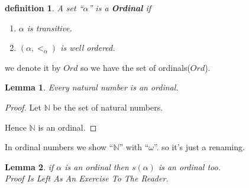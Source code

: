 \documentclass[10pt,a4paper]{book}
\newtheorem{definition}{definition}[section]
\newtheorem{lemma}{Lemma}[section]
\begin{document}
\begin{definition}  A set ``$\alpha$'' is a \textbf{Ordinal} if
    \begin{enumerate}
        \setlength{\itemsep}{0pt} %
        \item       $\alpha$ is transitive.
        \item       $(\alpha , <_\alpha) $ is well ordered.
    \end{enumerate}
\end{definition}

we denote it by $Ord$ so we have the set of ordinals($Ord$).

\begin{lemma}
    Every natural number is an ordinal.
\end{lemma}

\begin{proof}

    Let $\mathbb N$ be the set of natural numbers.

    \begin{fitchproof}[arrayenv=tabular]

         
         

         
         

         

    \end{fitchproof}

    Hence $\mathbb N$ is an ordinal.

\end{proof}

In ordinal numbers we show ``$\mathbb{N}$'' with ``$\omega$''. so it's just a
renaming.

\begin{lemma} if $\alpha$ is an ordinal then $s(\alpha)$ is an ordinal too.\\
    Proof Is Left As An Exercise To The Reader.
\end{lemma}
\end{document}
